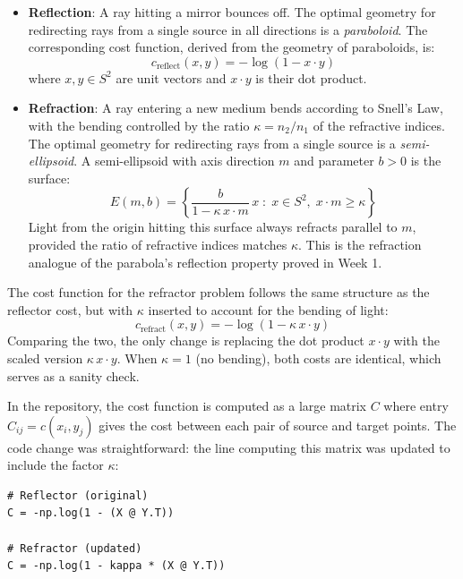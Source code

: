 \documentclass{article}
\begin{document}
\begin{itemize}
    \item \textbf{Reflection}: A ray hitting a mirror bounces off. The optimal geometry
    for redirecting rays from a single source in all directions is a \emph{paraboloid}.
    The corresponding cost function, derived from the geometry of paraboloids, is:
    \begin{equation}
        c_{\text{reflect}}(x, y) = -\log(1 - x \cdot y)
    \end{equation}
    where $x, y \in S^2$ are unit vectors and $x \cdot y$ is their dot product.

    \item \textbf{Refraction}: A ray entering a new medium bends according to Snell's
    Law, with the bending controlled by the ratio $\kappa = n_2 / n_1$ of the refractive
    indices. The optimal geometry for redirecting rays from a single source is a
    \emph{semi-ellipsoid}. A semi-ellipsoid with axis direction $m$ and parameter $b > 0$
    is the surface:
    \begin{equation}
        E(m, b) = \left\{ \frac{b}{1 - \kappa \, x \cdot m} \, x \; : \; x \in S^2, \; x \cdot m \geq \kappa \right\}
    \end{equation}
    Light from the origin hitting this surface always refracts parallel to $m$, provided
    the ratio of refractive indices matches $\kappa$. This is the refraction analogue
    of the parabola's reflection property proved in Week 1.
\end{itemize}

The cost function for the refractor problem follows the same structure as the reflector
cost, but with $\kappa$ inserted to account for the bending of light:
\begin{equation}
    c_{\text{refract}}(x, y) = -\log(1 - \kappa \, x \cdot y)
\end{equation}
Comparing the two, the only change is replacing the dot product $x \cdot y$ with the
scaled version $\kappa \, x \cdot y$. When $\kappa = 1$ (no bending), both costs are
identical, which serves as a sanity check.

In the repository, the cost function is computed as a large matrix $C$ where entry
$C_{ij} = c(x_i, y_j)$ gives the cost between each pair of source and target points.
The code change was straightforward: the line computing this matrix was updated to
include the factor $\kappa$:

\begin{verbatim}
# Reflector (original)
C = -np.log(1 - (X @ Y.T))

# Refractor (updated)
C = -np.log(1 - kappa * (X @ Y.T))
\end{verbatim}
\end{document}
